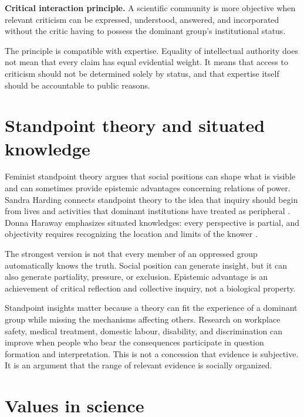 \begin{principlebox}
\textbf{Critical interaction principle.} A scientific community is more
objective when relevant criticism can be expressed, understood, answered, and
incorporated without the critic having to possess the dominant group's
institutional status.
\end{principlebox}

The principle is compatible with expertise. Equality of intellectual authority
does not mean that every claim has equal evidential weight. It means that
access to criticism should not be determined solely by status, and that
expertise itself should be accountable to public reasons.

\section{Standpoint theory and situated knowledge}

Feminist standpoint theory argues that social positions can shape what is
visible and can sometimes provide epistemic advantages concerning relations of
power. Sandra Harding connects standpoint theory to the idea that inquiry
should begin from lives and activities that dominant institutions have treated
as peripheral \citep{harding1991}. Donna Haraway emphasizes situated
knowledges: every perspective is partial, and objectivity requires recognizing
the location and limits of the knower \citep{haraway1988}.

The strongest version is not that every member of an oppressed group
automatically knows the truth. Social position can generate insight, but it
can also generate partiality, pressure, or exclusion. Epistemic advantage is
an achievement of critical reflection and collective inquiry, not a biological
property.

Standpoint insights matter because a theory can fit the experience of a
dominant group while missing the mechanisms affecting others. Research on
workplace safety, medical treatment, domestic labour, disability, and
discrimination can improve when people who bear the consequences participate in
question formation and interpretation. This is not a concession that evidence
is subjective. It is an argument that the range of relevant evidence is
socially organized.

\section{Values in science}


